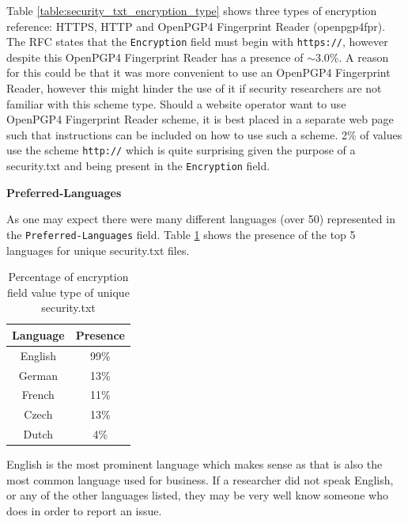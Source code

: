 \documentclass{mscreport}
\begin{document}
\noindent
Table \ref{table:security_txt_encryption_type} shows three types of encryption reference: HTTPS, HTTP and OpenPGP4 Fingerprint Reader (openpgp4fpr). The RFC states that the \texttt{Encryption} field must begin with \texttt{https://}, however despite this OpenPGP4 Fingerprint Reader has a presence of $\sim$3.0\%. A reason for this could be that it was more convenient to use an OpenPGP4 Fingerprint Reader, however this might hinder the use of it if security researchers are not familiar with this scheme type. Should a website operator want to use OpenPGP4 Fingerprint Reader scheme, it is best placed in a separate web page such that instructions can be included on how to use such a scheme. 2\% of values use the scheme \texttt{http://} which is quite surprising given the purpose of a security.txt and being present in the \texttt{Encryption} field.

\vspace{0.7cm} \noindent
\textbf{Preferred-Languages}

\noindent
As one may expect there were many different languages (over 50) represented in the \texttt{Preferred-Languages} field. Table \ref{table:security_txt_preferred_languages} shows the presence of the top 5 languages for unique security.txt files.

\begin{table}[H]
  \begin{center}
    \begin{tabular}{|c|c|}  %
      \hline
      \textbf{Language} & \textbf{Presence}\\
      \hline
      English & 99\%\\
      \hline
      German & 13\%\\
      \hline
      French & 11\%\\
      \hline
      Czech  & 13\%\\
      \hline
      Dutch & 4\%\\
      \hline
    \end{tabular}
    \caption{Percentage of encryption field value type of unique security.txt}
    \label{table:security_txt_preferred_languages} %
  \end{center}
\end{table}

\noindent
English is the most prominent language which makes sense as that is also the most common language used for business. If a researcher did not speak English, or any of the other languages listed, they may be very well know someone who does in order to report an issue.
\end{document}

